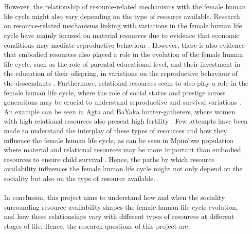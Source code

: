 \documentclass{article}
\begin{document}
\\\\
However, the relationship of resource-related mechanisms with the female human life cycle might also vary depending on the type of resource available. Research on resource-related mechanisms linking with variations in the female human life cycle have mainly focused on material resources due to evidence that economic conditions may mediate reproductive behaviour \citep{shenk2013model}. However, there is also evidence that embodied resources also played a role in the evolution of the female human life cycle, such as the role of parental educational level, and their investment in the education of their offspring, in variations on the reproductive behaviour of the descendants \citep{kaplan1996theory,snopkowski2014synthetic,snopkowski2016pathways}. Furthermore, relational resources seem to also play a role in the female human life cycle, where the role of social status and prestige across generations may be crucial to understand reproductive and survival variations \citep{boone1999more,shenk2016status}. An example can be seen in Agta and BaYaka hunter-gatherers, where women with high relational resources also present high fertility \citep{chaudhary2016competition,page2017hunter}. Few attempts have been made to understand the interplay of these types of resources and how they influence the female human life cycle, as can be seen in Mpimbwe population where material and relational resources may be more important than embodied resources to ensure child survival \citep{mulder2011understanding}. Hence, the paths by which resource availability influences the female human life cycle might not only depend on the sociality but also on the type of resource available.
\\\\
In conclusion, this project aims to understand how and when the sociality surrounding resource availability shapes the female human life cycle evolution, and how these relationships vary with different types of resources at different stages of life. Hence, the research questions of this project are:
\end{document}

